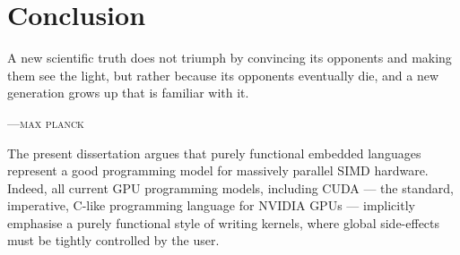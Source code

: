 %
%
%
%
%
%
%
%


\chapter{Conclusion}
\label{ch:conclusion}

\epigraph{A new scientific truth does not triumph by convincing its opponents
and making them see the light, but rather because its opponents eventually die,
and a new generation grows up that is familiar with it.}%
{\textsc{---max planck}}




The present dissertation argues that purely functional embedded languages
represent a good programming model for massively parallel SIMD hardware. Indeed,
all current GPU programming models, including CUDA --- the standard, imperative,
C-like programming language for NVIDIA GPUs --- implicitly emphasise a purely
functional style of writing kernels, where global side-effects must be tightly
controlled by the user.

